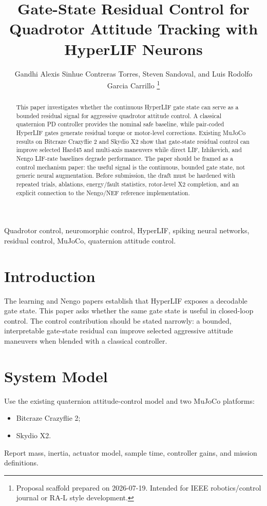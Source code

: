 \documentclass[journal]{IEEEtran}
\title{Gate-State Residual Control for Quadrotor Attitude Tracking with HyperLIF Neurons}
\author{Gandhi Alexis Sinhue Contreras Torres, Steven Sandoval, and Luis Rodolfo Garcia Carrillo%
\thanks{Proposal scaffold prepared on 2026-07-19. Intended for IEEE robotics/control journal or RA-L style development.}}
\begin{document}
\maketitle

\begin{abstract}
This paper investigates whether the continuous HyperLIF gate state can serve as a bounded residual signal for aggressive quadrotor attitude control. A classical quaternion PD controller provides the nominal safe baseline, while pair-coded HyperLIF gates generate residual torque or motor-level corrections. Existing MuJoCo results on Bitcraze Crazyflie 2 and Skydio X2 show that gate-state residual control can improve selected Hard45 and multi-axis maneuvers while direct LIF, Izhikevich, and Nengo LIF-rate baselines degrade performance. The paper should be framed as a control mechanism paper: the useful signal is the continuous, bounded gate state, not generic neural augmentation. Before submission, the draft must be hardened with repeated trials, ablations, energy/fault statistics, rotor-level X2 completion, and an explicit connection to the Nengo/NEF reference implementation.
\end{abstract}

\begin{IEEEkeywords}
Quadrotor control, neuromorphic control, HyperLIF, spiking neural networks, residual control, MuJoCo, quaternion attitude control.
\end{IEEEkeywords}

\section{Introduction}
The learning and Nengo papers establish that HyperLIF exposes a decodable gate state. This paper asks whether the same gate state is useful in closed-loop control. The control contribution should be stated narrowly: a bounded, interpretable gate-state residual can improve selected aggressive attitude maneuvers when blended with a classical controller.

\section{System Model}
Use the existing quaternion attitude-control model and two MuJoCo platforms:
\begin{itemize}
  \item Bitcraze Crazyflie 2;
  \item Skydio X2.
\end{itemize}
Report mass, inertia, actuator model, sample time, controller gains, and mission definitions.
\end{document}
